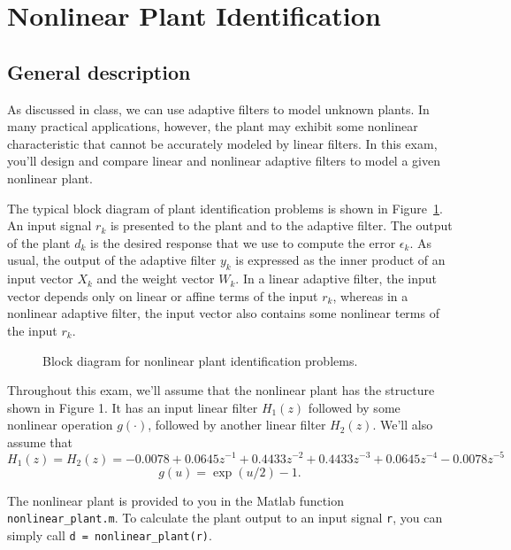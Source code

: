 \documentclass[10pt]{article}
\begin{document}
\doublespacing
\section*{Nonlinear Plant Identification}

\subsection*{General description}

As discussed in class, we can use adaptive filters to model unknown plants. In many practical applications, however, the plant may exhibit some nonlinear characteristic that cannot be accurately modeled by linear filters. In this exam, you'll design and compare linear and nonlinear adaptive filters to model a given nonlinear plant.

The typical block diagram of plant identification problems is shown in Figure~\ref{fig:block-diagram}. An input signal $r_k$ is presented to the plant and to the adaptive filter. The output of the plant $d_k$ is the desired response that we use to compute the error $\epsilon_k$. As usual, the output of the adaptive filter $y_k$ is expressed as the inner product of an input vector $X_k$ and the weight vector $W_k$. In a linear adaptive filter, the input vector depends only on linear or affine terms of the input $r_k$, whereas in a nonlinear adaptive filter, the input vector also contains some nonlinear terms of the input $r_k$.

\begin{figure}[h!]
	\flushleft
	\resizebox{\linewidth}{!}{}
	\caption{Block diagram for nonlinear plant identification problems. } \label{fig:block-diagram}
\end{figure}

Throughout this exam, we'll assume that the nonlinear plant has the structure shown in Figure 1. It has an input linear filter $H_1(z)$ followed by some nonlinear operation $g(\cdot)$, followed by another linear filter $H_2(z)$. We'll also assume that
\begin{equation}
H_1(z) = H_2(z) = -0.0078 + 0.0645z^{-1} +  0.4433z^{-2} + 0.4433z^{-3}+ 0.0645z^{-4} -0.0078z^{-5}
\end{equation}
\begin{equation}
g(u) = \exp(u/2) - 1.
\end{equation}

The nonlinear plant is provided to you in the Matlab function \texttt{nonlinear\_plant.m}. To calculate the plant output to an input signal \texttt{r}, you can simply call \texttt{d = nonlinear\_plant(r)}.
\end{document}
